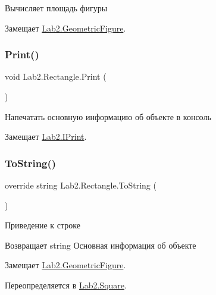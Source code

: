 Вычисляет площадь фигуры 

Замещает \hyperlink{class_lab2_1_1_geometric_figure_aeb0853b133cedd1d23f5d8a1d73af8a8}{Lab2.\+Geometric\+Figure}.

\mbox{\label{class_lab2_1_1_rectangle_a7bc8ce3f09ba299aba57045c396b6b4e}} 
\subsubsection{\texorpdfstring{Print()}{Print()}}
{\footnotesize\ttfamily void Lab2.\+Rectangle.\+Print (\begin{DoxyParamCaption}{ }\end{DoxyParamCaption})}

Напечатать основную информацию об объекте в консоль 

Замещает \hyperlink{interface_lab2_1_1_i_print_ab2ab78a92b129513c12b26f473d65c31}{Lab2.\+I\+Print}.

\mbox{\label{class_lab2_1_1_rectangle_a6c03cbd28985951c1c167b51ed47cdd4}} 
\subsubsection{\texorpdfstring{To\+String()}{ToString()}}
{\footnotesize\ttfamily override string Lab2.\+Rectangle.\+To\+String (\begin{DoxyParamCaption}{ }\end{DoxyParamCaption})\hspace{0.3cm}{\ttfamily [virtual]}}

Приведение к строке \begin{DoxyReturn}{Возвращает}
string Основная информация об объекте 
\end{DoxyReturn}


Замещает \hyperlink{class_lab2_1_1_geometric_figure_a2f466edc438f43540ead2bc66925ef0a}{Lab2.\+Geometric\+Figure}.



Переопределяется в \hyperlink{class_lab2_1_1_square_ac43e17280bb521a3466a38ec0e4742eb}{Lab2.\+Square}.



